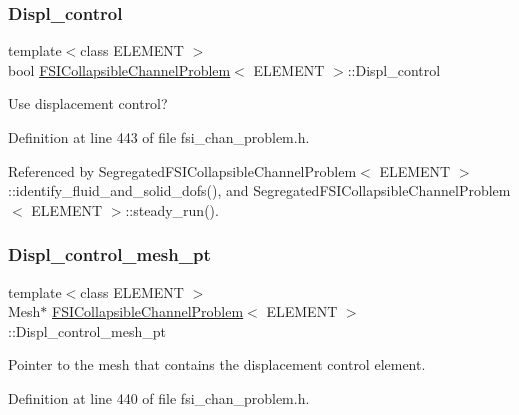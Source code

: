 \subsubsection{\texorpdfstring{Displ\+\_\+control}{Displ\_control}}
{\footnotesize\ttfamily template$<$class E\+L\+E\+M\+E\+NT $>$ \\
bool \hyperlink{classFSICollapsibleChannelProblem}{F\+S\+I\+Collapsible\+Channel\+Problem}$<$ E\+L\+E\+M\+E\+NT $>$\+::Displ\+\_\+control\hspace{0.3cm}{\ttfamily [protected]}}



Use displacement control? 



Definition at line 443 of file fsi\+\_\+chan\+\_\+problem.\+h.



Referenced by Segregated\+F\+S\+I\+Collapsible\+Channel\+Problem$<$ E\+L\+E\+M\+E\+N\+T $>$\+::identify\+\_\+fluid\+\_\+and\+\_\+solid\+\_\+dofs(), and Segregated\+F\+S\+I\+Collapsible\+Channel\+Problem$<$ E\+L\+E\+M\+E\+N\+T $>$\+::steady\+\_\+run().

\mbox{\label{classFSICollapsibleChannelProblem_acf74b392297104d704004124b8dfc7bb}} 
\subsubsection{\texorpdfstring{Displ\+\_\+control\+\_\+mesh\+\_\+pt}{Displ\_control\_mesh\_pt}}
{\footnotesize\ttfamily template$<$class E\+L\+E\+M\+E\+NT $>$ \\
Mesh$\ast$ \hyperlink{classFSICollapsibleChannelProblem}{F\+S\+I\+Collapsible\+Channel\+Problem}$<$ E\+L\+E\+M\+E\+NT $>$\+::Displ\+\_\+control\+\_\+mesh\+\_\+pt\hspace{0.3cm}{\ttfamily [protected]}}



Pointer to the mesh that contains the displacement control element. 



Definition at line 440 of file fsi\+\_\+chan\+\_\+problem.\+h.



